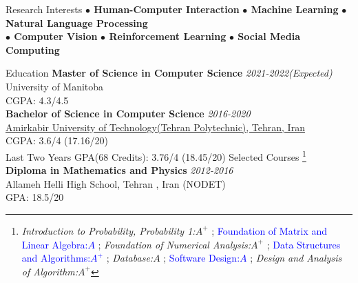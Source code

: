 \documentclass{resume} %
\begin{document}
	
	\begin{rSection}{Research Interests}
			\textbf{ $\bullet$ Human-Computer Interaction}\hspace*{16pt}
			\textbf{ $\bullet$ Machine Learning}\hspace*{16pt}
			\textbf{$\bullet$ Natural Language Processing} \hspace*{16pt}\\
			\textbf{ $\bullet$ Computer Vision}\hspace*{16pt}
			\textbf{ $\bullet$ Reinforcement Learning}\hspace*{16pt}
			\textbf{ $\bullet$ Social Media Computing}	\hspace*{16pt}	


	\end{rSection}
	
	
	\begin{rSection}{Education}
		{\bf Master of Science in Computer Science} \hfill {\em 2021-2022(Expected)} \\ 
		\textcolor{coolblack}{University of Manitoba}\\
		CGPA: 4.3/4.5\\

		{\bf Bachelor of Science in Computer Science} \hfill {\em 2016-2020} \\ 
		\href{https://www.topuniversities.com/universities/amirkabir-university-technology}{\textcolor{coolblack}{Amirkabir University of Technology(Tehran Polytechnic), Tehran, Iran} }\\
		CGPA: 3.6/4 (17.16/20)\\
		Last Two Years GPA(68 Credits): 3.76/4 (18.45/20) \hspace{20pt}		Selected Courses
		\footnote{\textit{Introduction to Probability, Probability 1:$A^{+}$ }; \textcolor{blue}{Foundation of Matrix and Linear Algebra:$A$ }; \textit{Foundation of Numerical Analysis:$A^{+}$ };  \textcolor{blue}{Data Structures and Algorithms:$A^{+}$ }; \textit{Database:$A$ }; \textcolor{blue}{Software Design:$A$} ; \textit{Design and Analysis of Algorithm:$A^{+}$}} \\
		{\bf Diploma in Mathematics and Physics} \hfill {\em 2012-2016}\\ 
		Allameh Helli High School, Tehran , Iran (NODET)\\
		GPA: 18.5/20
	\end{rSection}
	
\end{document}

